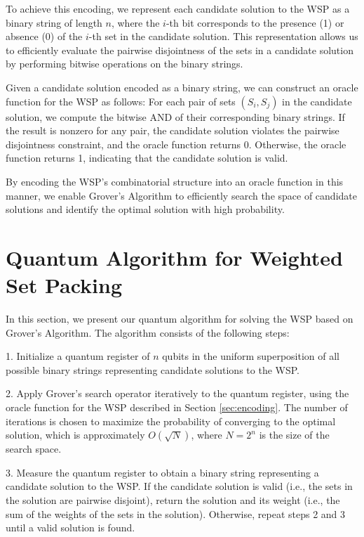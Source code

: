 To achieve this encoding, we represent each candidate solution to the WSP as a binary string of length $n$, where the $i$-th bit corresponds to the presence (1) or absence (0) of the $i$-th set in the candidate solution. This representation allows us to efficiently evaluate the pairwise disjointness of the sets in a candidate solution by performing bitwise operations on the binary strings.

Given a candidate solution encoded as a binary string, we can construct an oracle function for the WSP as follows: For each pair of sets $(S_i, S_j)$ in the candidate solution, we compute the bitwise AND of their corresponding binary strings. If the result is nonzero for any pair, the candidate solution violates the pairwise disjointness constraint, and the oracle function returns 0. Otherwise, the oracle function returns 1, indicating that the candidate solution is valid.

By encoding the WSP's combinatorial structure into an oracle function in this manner, we enable Grover's Algorithm to efficiently search the space of candidate solutions and identify the optimal solution with high probability.

\section{Quantum Algorithm for Weighted Set Packing}\label{sec:algorithm}

In this section, we present our quantum algorithm for solving the WSP based on Grover's Algorithm. The algorithm consists of the following steps:

1. Initialize a quantum register of $n$ qubits in the uniform superposition of all possible binary strings representing candidate solutions to the WSP.

2. Apply Grover's search operator iteratively to the quantum register, using the oracle function for the WSP described in Section \ref{sec:encoding}. The number of iterations is chosen to maximize the probability of converging to the optimal solution, which is approximately $O(\sqrt{N})$, where $N = 2^n$ is the size of the search space.

3. Measure the quantum register to obtain a binary string representing a candidate solution to the WSP. If the candidate solution is valid (i.e., the sets in the solution are pairwise disjoint), return the solution and its weight (i.e., the sum of the weights of the sets in the solution). Otherwise, repeat steps 2 and 3 until a valid solution is found.

